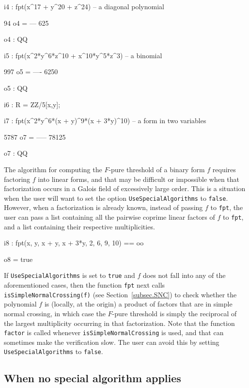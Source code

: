 \documentclass{amsart}
\begin{document}
\smallskip
{\small
{}
\begin{MyVerbatim}
i4 : fpt(x^17 + y^20 + z^24) -- a diagonal polynomial

      94
o4 = ---
     625

o4 : QQ

i5 : fpt(x^2*y^6*z^10 + x^10*y^5*z^3) -- a binomial

      997
o5 = ----
     6250

o5 : QQ

i6 : R = ZZ/5[x,y];

i7 : fpt(x^2*y^6*(x + y)^9*(x + 3*y)^10) -- a form in two variables

      5787
o7 = -----
     78125

o7 : QQ
\end{MyVerbatim}
}
\smallskip

\noindent The algorithm for computing the $F$-pure threshold of a binary form $f$ requires factoring $f$ into linear forms, and that may be difficult or impossible when that factorization occurs in a Galois field of excessively large order.
This is a situation when the user will want to set the option \texttt{UseSpecialAlgorithms} to \texttt{false}.
However, when a factorization is already known, instead of passing $f$ to \texttt{fpt}, the user can pass a list containing all the pairwise coprime linear factors of $f$ to \texttt{fpt}, and a list containing their respective multiplicities.

\smallskip
{\small
{}
\begin{MyVerbatim}
i8 : fpt({x, y, x + y, x + 3*y}, {2, 6, 9, 10}) == oo

o8 = true
\end{MyVerbatim}
}
\smallskip

If \texttt{UseSpecialAlgorithms} is set to \texttt{true} and $f$ does not fall into any of the aforementioned cases, then the function \texttt{fpt} next calls \texttt{isSimpleNormalCrossing(f)} (see Section~\ref{subsec.SNC}) to check whether the polynomial $f$ is (locally, at the origin) a product of factors that are in simple normal crossing, in which case the $F$-pure threshold is simply the reciprocal of the largest multiplicity occurring in that factorization.  
Note that the function \texttt{factor} is called whenever \texttt{isSimpleNormalCrossing} is used, and that can sometimes make the verification slow.  The user can avoid this by setting \texttt{UseSpecialAlgorithms} to \texttt{false}.

\subsection{When no special algorithm applies}
\end{document}
